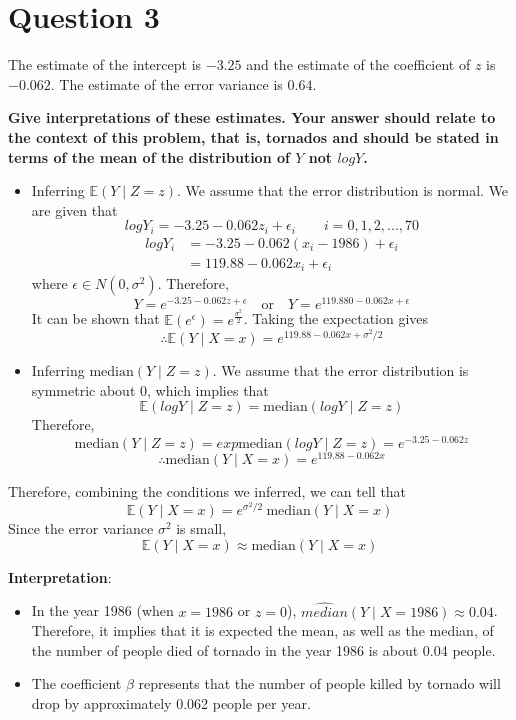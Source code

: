 \documentclass[
]{book}
\providecommand{\tightlist}{%
  \setlength{\itemsep}{0pt}\setlength{\parskip}{0pt}}
\begin{document}
\section{Question 3}\label{question-3-4}

The estimate of the intercept is \(-3.25\) and the estimate of the coefficient of \(z\) is \(-0.062\). The estimate of the error variance is \(0.64\).

\textbf{Give interpretations of these estimates. Your answer should relate to the context of this problem, that is, tornados and should be stated in terms of the mean of the distribution of \(Y\) not \(log Y\).}\\

\begin{itemize}
\item
  Inferring \(\mathbb{E}(Y \mid Z = z)\). We assume that the error distribution is normal.
  We are given that
  \[log Y_i = -3.25 - 0.062z_i + \epsilon_i \qquad i = 0, 1, 2, ..., 70\]
  \[
  \begin{aligned}
  log Y_i &= -3.25 - 0.062(x_i -1986) + \epsilon_i \\
        &= 119.88 - 0.062x_i + \epsilon_i
  \end{aligned}
  \]
  where \(\epsilon \in N(0, \sigma^2)\). Therefore,
  \[Y = e^{-3.25-0.062z + \epsilon} \quad \text{or} \quad Y = e^{119.880-0.062x + \epsilon}\]
  It can be shown that \(\mathbb{E}(e^{\epsilon}) = e^{\frac{\sigma^2}{2}}\). Taking the expectation gives
  \[\therefore \mathbb{E}(Y \mid X = x) = e^{119.88 - 0.062x + \sigma^2/2}\]
\item
  Inferring \(\text{median}(Y \mid Z = z)\). We assume that the error distribution is symmetric about 0, which implies that
  \[\mathbb{E}(log Y \mid Z = z) = \text{median}(log Y \mid Z = z)\]
  Therefore,
  \[\text{median}(Y \mid Z = z) = exp{\text{median}(log Y \mid Z = z)} = e^{-3.25-0.062z}\]
  \[\therefore \text{median}(Y \mid X = x) = e^{119.88 - 0.062x}\]
\end{itemize}

Therefore, combining the conditions we inferred, we can tell that
\[\mathbb{E}(Y \mid X = x) = e^{\sigma^2 / 2} \ \text{median}(Y \mid X = x)\]
Since the error variance \(\sigma^2\) is small,
\[\mathbb{E}(Y \mid X = x) \approx \text{median}(Y \mid X = x)\]

\textbf{Interpretation}:

\begin{itemize}
\tightlist
\item
  In the year 1986 (when \(x = 1986\) or \(z = 0\)), \(\hat{median}(Y \mid X = 1986) \approx 0.04\). Therefore, it implies that it is expected the mean, as well as the median, of the number of people died of tornado in the year 1986 is about 0.04 people.
\item
  The coefficient \(\beta\) represents that the number of people killed by tornado will drop by approximately 0.062 people per year.
\end{itemize}

  
\end{document}
